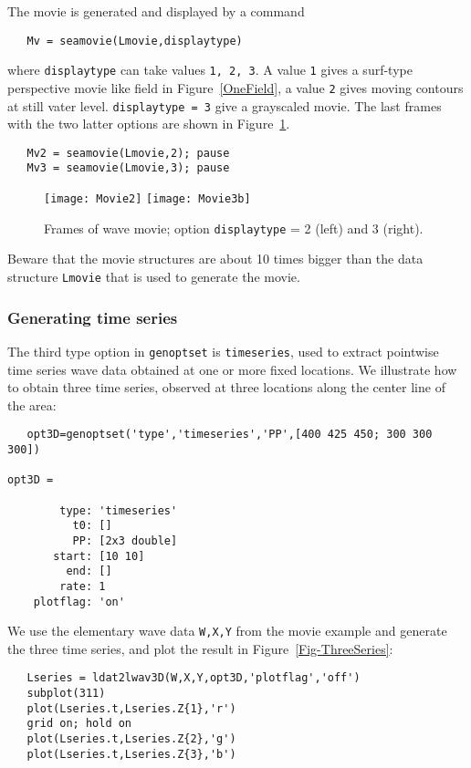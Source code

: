The movie is generated and displayed by a command
{\small\begin{verbatim}
   Mv = seamovie(Lmovie,displaytype)
\end{verbatim}
}
\noindent where {\tt displaytype} can take values {\tt 1, 2, 3}. A value {\tt 1} gives a surf-type perspective  movie like field in Figure~\ref{OneField}, a value {\tt 2} gives moving contours at still vater level. {\tt displaytype = 3} give a grayscaled movie. The last frames with the two latter options are shown in Figure~\ref{TwoMovieFrames}.
{\small\begin{verbatim}
   Mv2 = seamovie(Lmovie,2); pause
   Mv3 = seamovie(Lmovie,3); pause
\end{verbatim}
}

\begin{figure}
\centerline{
\texttt{[image: Movie2]}
\texttt{[image: Movie3b]}
}
\caption{Frames of wave movie; option {\tt displaytype} = 2 (left) and  3 (right).}
\label{TwoMovieFrames}
\end{figure}

Beware that the movie structures are about 10 times bigger than the data structure {\tt Lmovie} that is used to generate the movie.

\subsubsection*{Generating time series}
The third type option in {\tt genoptset} is {\tt timeseries}, used to extract pointwise time series wave data obtained at one or more fixed locations. We illustrate how to obtain three time series, observed at three locations along the center line of the area:
{\small\begin{verbatim}
   opt3D=genoptset('type','timeseries','PP',[400 425 450; 300 300 300])

opt3D =

        type: 'timeseries'
          t0: []
          PP: [2x3 double]
       start: [10 10]
         end: []
        rate: 1
    plotflag: 'on'
\end{verbatim}
}

We use the elementary wave data {\tt W,X,Y} from the movie example and generate the three time series, and plot the result in Figure~\ref{Fig-ThreeSeries}:
{\small\begin{verbatim}
   Lseries = ldat2lwav3D(W,X,Y,opt3D,'plotflag','off')
   subplot(311)
   plot(Lseries.t,Lseries.Z{1},'r')
   grid on; hold on
   plot(Lseries.t,Lseries.Z{2},'g')
   plot(Lseries.t,Lseries.Z{3},'b')
\end{verbatim}
}

